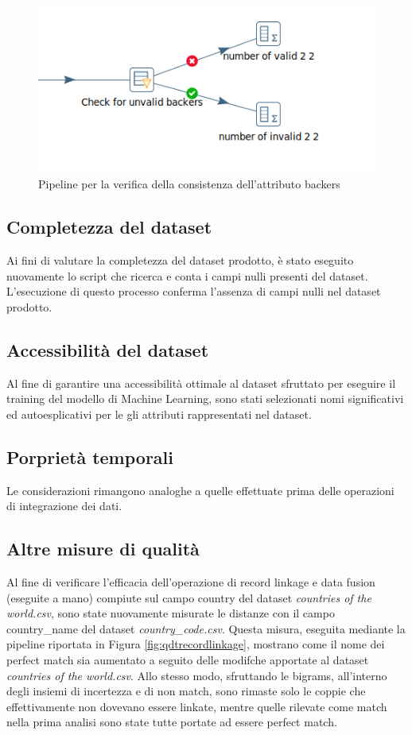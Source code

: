 \begin{figure}[h!]
	\centering
	\includegraphics[width=0.7\linewidth]{images/DQT_backers}
	\caption{Pipeline per la verifica della consistenza dell'attributo backers}
	\label{fig:dqtbackers}
\end{figure}

\subsection{Completezza del dataset}
Ai fini di valutare la completezza del dataset prodotto, è stato eseguito nuovamente lo script che ricerca e conta i campi nulli presenti del dataset. L'esecuzione di questo processo conferma l'assenza di campi nulli nel dataset prodotto.

\subsection{Accessibilità del dataset}
Al fine di garantire una accessibilità ottimale al dataset sfruttato per eseguire il training del modello di Machine Learning, sono stati selezionati nomi significativi ed autoesplicativi per le gli attributi rappresentati nel dataset.

\subsection{Porprietà temporali}
Le considerazioni rimangono analoghe a quelle effettuate prima delle operazioni di integrazione dei dati.

\subsection{Altre misure di qualità}
Al fine di verificare l'efficacia dell'operazione di record linkage e data fusion (eseguite a mano) compiute sul campo country del dataset \textit{countries of the world.csv}, sono state nuovamente misurate le distanze con il campo country\_name del dataset \textit{country\_code.csv}. Questa misura, eseguita mediante la pipeline riportata in Figura \ref{fig:qdtrecordlinkage}, mostrano come il nome dei perfect match sia aumentato a seguito delle modifche apportate al dataset \textit{countries of the world.csv}. Allo stesso modo, sfruttando le bigrams, all'interno degli insiemi di incertezza e di non match, sono rimaste solo le coppie che effettivamente non dovevano essere linkate, mentre quelle rilevate come match nella prima analisi sono state tutte portate ad essere perfect match.

